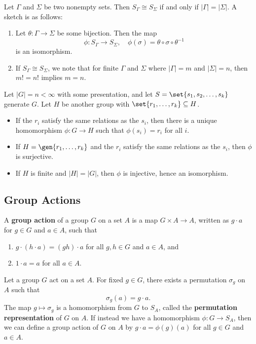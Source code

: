 \ex Let $\Gamma$ and $\Sigma$ be two nonempty sets. Then $S_\Gamma \cong S_\Sigma$ if and only if $|\Gamma| = |\Sigma|$. A sketch is as follows:
\begin{enumerate}
    \item Let $\theta : \Gamma \to \Sigma$ be some bijection. Then the map
    \[\phi : S_\Gamma \to S_\Sigma, \quad \phi(\sigma) = \theta \circ \sigma \circ \theta^{-1}\]
    is an isomorphism.
    \item If $S_\Gamma \cong S_\Sigma$, we note that for finite $\Gamma$ and $\Sigma$ where $|\Gamma| = m$ and $|\Sigma| = n$, then $m! = n!$ implies $m = n$.
\end{enumerate}

\note Let $|G| = n < \infty$ with some presentation, and let $S = \set{s_1, s_2, \ldots, s_k}$ generate $G$. Let $H$ be another group with $\set{r_1, \ldots, r_k} \subseteq H$.
\begin{itemize}
    \item If the $r_i$ satisfy the same relations as the $s_i$, then there is a unique homomorphism $\phi : G \to H$ such that $\phi(s_i) = r_i$ for all $i$.
    \item If $H = \gen{r_1, \ldots, r_k}$ and the $r_i$ satisfy the same relations as the $s_i$, then $\phi$ is surjective.
    \item If $H$ is finite and $|H| = |G|$, then $\phi$ is injective, hence an isomorphism.
\end{itemize}

\newpage

\subsection{Group Actions} \label{sec1.7}

 A \textbf{group action} of a group $G$ on a set $A$ is a map $G \times A \to A$, written as $g \cdot a$ for $g \in G$ and $a \in A$, such that
\begin{enumerate}
    \item $g \cdot (h \cdot a) = (gh) \cdot a$ for all $g, h \in G$ and $a \in A$, and
    \item $1 \cdot a = a$ for all $a \in A$.
\end{enumerate}

 Let a group $G$ act on a set $A$. For fixed $g \in G$, there exists a permutation $\sigma_g$ on $A$ such that
\[\sigma_g(a) = g \cdot a.\]
The map $g \mapsto \sigma_g$ is a homomorphism from $G$ to $S_A$, called the \textbf{permutation representation} of $G$ on $A$. If instead we have a homomorphism $\phi : G \to S_A$, then we can define a group action of $G$ on $A$ by $g \cdot a = \phi(g)(a)$ for all $g \in G$ and $a \in A$.

